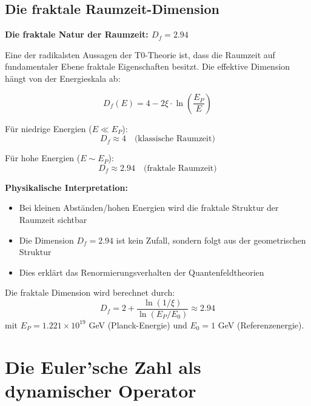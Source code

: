 \documentclass[12pt,a4paper]{article}
\newcommand{\xipar}{\xi}
\begin{document}
	\subsection{Die fraktale Raumzeit-Dimension}
	
	\begin{abhandlung}
		\textbf{Die fraktale Natur der Raumzeit: $D_f = 2.94$}
		
		Eine der radikalsten Aussagen der T0-Theorie ist, dass die Raumzeit auf fundamentaler Ebene fraktale Eigenschaften besitzt. Die effektive Dimension hängt von der Energieskala ab:
		
		\begin{equation}
			D_f(E) = 4 - 2\xipar \cdot \ln\left(\frac{E_P}{E}\right)
		\end{equation}
		
		Für niedrige Energien ($E \ll E_P$):
		\begin{equation}
			D_f \approx 4 \quad \text{(klassische Raumzeit)}
		\end{equation}
		
		Für hohe Energien ($E \sim E_P$):
		\begin{equation}
			D_f \approx 2.94 \quad \text{(fraktale Raumzeit)}
		\end{equation}
		
		\textbf{Physikalische Interpretation:}
		\begin{itemize}
			\item Bei kleinen Abständen/hohen Energien wird die fraktale Struktur der Raumzeit sichtbar
			\item Die Dimension $D_f = 2.94$ ist kein Zufall, sondern folgt aus der geometrischen Struktur
			\item Dies erklärt das Renormierungsverhalten der Quantenfeldtheorien
		\end{itemize}
		
		Die fraktale Dimension wird berechnet durch:
		\begin{equation}
			D_f = 2 + \frac{\ln(1/\xipar)}{\ln(E_P/E_0)} \approx 2.94
		\end{equation}
		mit $E_P = 1.221 \times 10^{19}$ GeV (Planck-Energie) und $E_0 = 1$ GeV (Referenzenergie).
	\end{abhandlung}
	
	\section{Die Euler'sche Zahl als dynamischer Operator}
	
\end{document}
